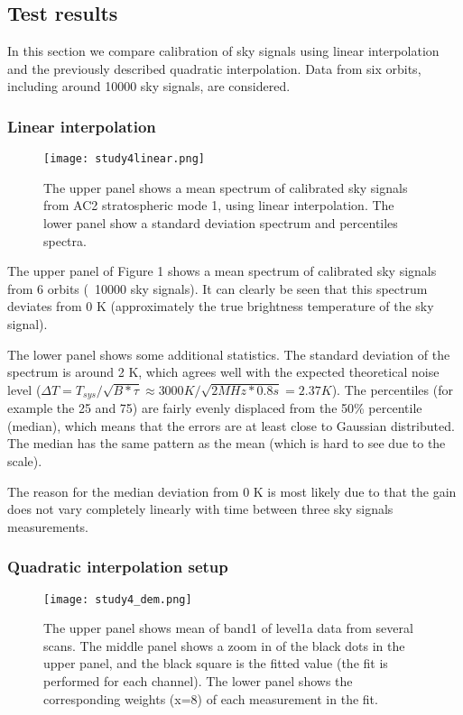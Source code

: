 \subsection{Test results}

In this section we compare calibration of sky signals
using linear interpolation and the previously described
quadratic interpolation. Data from six orbits, including around
10000 sky signals, are considered. 


\subsubsection{Linear interpolation}
\begin{figure}[!t]
\centering
\texttt{[image: study4linear.png]}\\
\caption{The upper panel shows a mean spectrum of calibrated
sky signals from AC2 stratospheric mode 1,
using linear interpolation. 
The lower panel show a standard deviation spectrum
and percentiles spectra.}
\label{fig:study4linear.png}
\end{figure}

The upper panel of Figure 1 shows a mean spectrum
of calibrated sky signals from 6 orbits (~10000 sky signals). 
It can clearly be seen
that this spectrum deviates from 0 K (approximately the true brightness 
temperature of the sky signal).

The lower panel shows some additional statistics.
The standard deviation of the spectrum is around 2 K,
which agrees well with the expected theoretical noise level
(\(\Delta T =T_{sys}/\sqrt{B*\tau} \approx 3000 K / \sqrt{2MHz*0.8s}=2.37 K\)).
The percentiles (for example the 25 and 75) are fairly evenly
displaced from the 50\% percentile (median),
which means that the errors are at least close to Gaussian
distributed.  
The median has the same pattern as the mean (which is hard to see
due to the scale).

The reason for the median deviation from 0 K is most likely due to 
that the gain does not vary
completely linearly with time between three sky signals
measurements.

\subsubsection{Quadratic interpolation setup}
\begin{figure}[!t]
\centering
\texttt{[image: study4\_dem.png]}\\
\caption{The upper panel shows mean of band1 of level1a data
from several scans.
The middle panel shows a zoom in of the black dots in the upper panel,
and the black square is the fitted value
(the fit is performed for each channel).
The lower panel shows the corresponding weights (x=8) of each measurement 
in the fit. }
\label{fig:study4_dem.png}
\end{figure}

